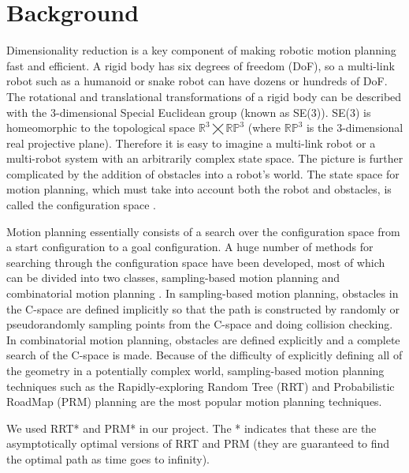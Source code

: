 \documentclass[12pt]{article}
\begin{document}
\maketitle

\section{Background}

Dimensionality reduction is a key component of making robotic motion planning
fast and efficient. A rigid body has six degrees of freedom (DoF), so a
multi-link robot such as a humanoid or snake robot can have dozens or hundreds
of DoF. The rotational and translational transformations of a rigid body can be
described with the 3-dimensional Special Euclidean group (known as SE(3)).
SE(3) is homeomorphic to the topological space $\mathbb{R}^3\bigtimes\mathbb{RP}^3$ (where $\mathbb{RP}^3$ is the
3-dimensional real projective plane). Therefore it is easy to imagine a
multi-link robot \cite{kuindersma2015optimization} or a multi-robot system \cite{alonso2015multi} with an arbitrarily complex state space. The picture is
further complicated by the addition of obstacles into a robot's world. The
state space for motion planning, which must take into account both the robot
and obstacles, is called the configuration space \cite{lozano1983spatial}. 

Motion planning essentially consists of a search over the configuration space
from a start configuration to a goal configuration. A huge number of methods
for searching through the configuration space have been developed, most of
which can be divided into two classes, sampling-based motion planning and
combinatorial motion planning \cite{lavalle2006planning}. In sampling-based motion planning, obstacles in
the C-space are defined implicitly so that the path is constructed by randomly
or pseudorandomly sampling points from the C-space and doing collision
checking. In combinatorial motion planning, obstacles are defined explicitly
and a complete search of the C-space is made. Because of the difficulty of
explicitly defining all of the geometry in a potentially complex world,
sampling-based motion planning techniques such as the Rapidly-exploring Random
Tree (RRT) and Probabilistic RoadMap (PRM) planning are the most popular motion
planning techniques.

We used RRT* and PRM* in our project. The * indicates that these are the
asymptotically optimal versions of RRT and PRM (they are guaranteed to find the
optimal path as time goes to infinity).
\end{document}

